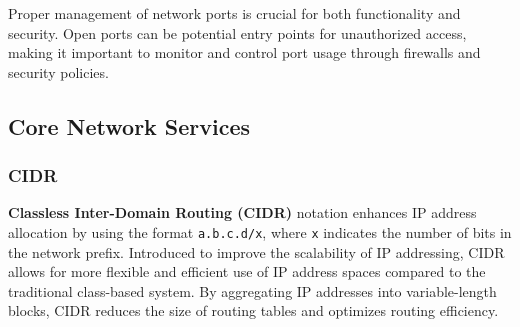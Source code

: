 Proper management of network ports is crucial for both functionality and security. Open ports can be potential entry points for unauthorized access, making it important to monitor and control port usage through firewalls and security policies.


\subsection{Core Network Services}
\label{core_network_services}

\subsubsection{CIDR}
\label{cidr}

\textbf{Classless Inter-Domain Routing (CIDR)} notation enhances IP address allocation by using the format \texttt{a.b.c.d/x}, where \texttt{x} indicates the number of bits in the network prefix. Introduced to improve the scalability of IP addressing, CIDR allows for more flexible and efficient use of IP address spaces compared to the traditional class-based system. By aggregating IP addresses into variable-length blocks, CIDR reduces the size of routing tables and optimizes routing efficiency.


